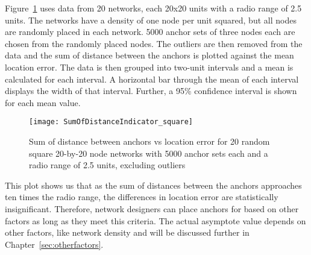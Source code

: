 Figure~\ref{fig:sumOfDistanceIndicator} uses data from 20 networks, each 20x20 units with a radio range of 2.5 units.  The networks have a density of one node per unit squared, but all nodes are randomly placed in each network.  5000 anchor sets of three nodes each are chosen from the randomly placed nodes.  The outliers are then removed from the data and the sum of distance between the anchors is plotted against the mean location error.  The data is then grouped into two-unit intervals and a mean is calculated for each interval.  A horizontal bar through the mean of each interval displays the width of that interval.  Further, a 95\% confidence interval is shown for each mean value.  

\begin{figure}
  \centering
	\texttt{[image: SumOfDistanceIndicator\_square]}
	\caption[Sum of distance between anchors vs location error]{Sum of distance between anchors vs location error for 20 random square 20-by-20 node networks with 5000 anchor sets each and a radio range of 2.5 units, excluding outliers}
	\label{fig:sumOfDistanceIndicator}
\end{figure}

This plot shows us that as the sum of distances between the anchors approaches ten times the radio range, the differences in location error are statistically insignificant.  Therefore, network designers can place anchors for based on other factors as long as they meet this criteria.  The actual asymptote value depends on other factors, like network density and will be discussed further in Chapter~\ref{sec:otherfactors}.
